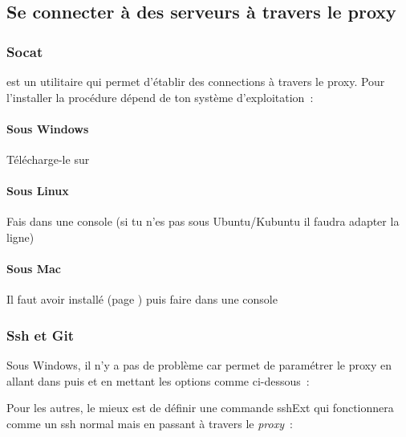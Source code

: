 \subsection{Se connecter à des serveurs à travers le proxy}

\subsubsection{Socat}

 est un utilitaire qui permet d'établir des connections à travers le proxy. Pour l'installer la procédure dépend de ton système d'exploitation~:

\paragraph{Sous Windows} Télécharge-le sur 
\paragraph{Sous Linux} Fais  dans une console (si tu n'es pas sous Ubuntu/Kubuntu il faudra adapter la ligne)
\paragraph{Sous Mac} Il faut avoir installé  (page \pageref{mac-fink}) puis faire dans une console

\subsubsection{Ssh et Git}

Sous Windows, il n'y a pas de problème car  permet de paramétrer le proxy en allant dans  puis  et en mettant les options comme ci-dessous~:


Pour les autres, le mieux est de définir une commande sshExt qui fonctionnera comme un ssh normal mais en passant à travers le \emph{proxy}~:


